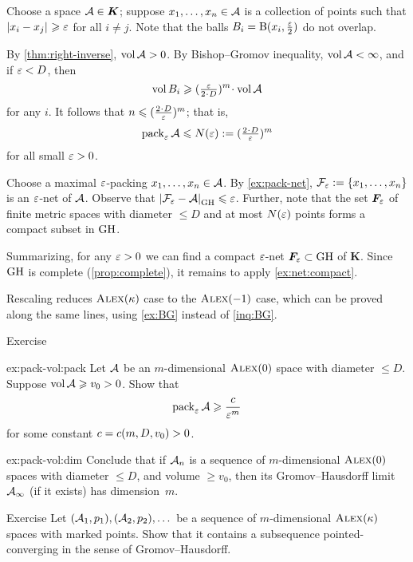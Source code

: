 Choose a space $\mathcal{A}\in \bm{K}$;
suppose $x_1,\dots,x_n\in \mathcal{A}$ is a collection of points such that $|{x_i}-{x_j}|_{}^{{}}\geqslant \varepsilon$ for all $i\ne j$.
Note that the balls $B_i=\mathrm{B}{}(x_i,\tfrac{\varepsilon}2)$ do not overlap.

By \ref{thm:right-inverse}, $\operatorname{\rm vol}\nolimits \mathcal{A}>0$.
By Bishop--Gromov inequality, $\operatorname{\rm vol}\nolimits \mathcal{A}<\infty$,
and if $\varepsilon<D$, then 
\[\vol B_i\ge (\tfrac\eps{2\cdot D})^m\cdot\vol \spc{A}\]
for any $i$.
It follows that $n\le (\tfrac{2\cdot D}\eps)^m$;
that is, 
\[\pack_\eps\spc{A}\le  N(\eps)\df(\tfrac{2\cdot D}\eps)^m\]
for all small $\varepsilon>0$.

Choose a maximal $\varepsilon$-packing $x_1,\dots,x_n\in \mathcal{A}$.
By \ref{ex:pack-net}, $\mathcal{F}_\varepsilon\mathrel{:=}\{x_1,\dots,x_n\}$ is an $\varepsilon$-net of $\mathcal{A}$.
Observe that $|{\mathcal{F}_\varepsilon}-{\mathcal{A}}|_{\operatorname{\rm GH}\nolimits}^{{}}\leqslant \varepsilon$.
Further, note that the set $\bm{F}_\varepsilon$ of finite metric spaces with diameter $\le D$ and at most $N(\varepsilon)$ points forms a compact subset in $\operatorname{\rm GH}\nolimits$.

Summarizing, for any $\varepsilon>0$ we can find a compact $\varepsilon$-net $\bm{F}_\varepsilon\subset \operatorname{\rm GH}\nolimits$ of $\bm{K}$.
Since $\operatorname{\rm GH}\nolimits$ is complete (\ref{prop:complete}), it remains to apply \ref{ex:net:compact}.

Rescaling reduces $\textsc{Alex}(\kappa)$ case to the $\textsc{Alex}(-1)$ case, which can be proved along the same lines, using \ref{ex:BG} instead of \ref{inq:BG}.
\qeds

\begin{thm}{Exercise}\label{ex:pack-vol}

\begin{subthm}{ex:pack-vol:pack}
Let $\mathcal{A}$ be an $m$-dimensional $\textsc{Alex}(0)$ space with diameter $\le D$.
Suppose $\operatorname{\rm vol}\nolimits\mathcal{A}\geqslant v_0>0$.
Show that 
\[\operatorname{\rm pack}\nolimits_\varepsilon\mathcal{A}\geqslant \frac{c}{\varepsilon^m}\]
for some constant $c=c(m,D,v_0)>0$.
\end{subthm}


\begin{subthm}{ex:pack-vol:dim}
Conclude that if $\mathcal{A}_n$ is a sequence of $m$-dimensional $\textsc{Alex}(0)$ spaces with diameter $\le D$, and volume $\ge v_0$, then its Gromov--Hausdorff limit $\mathcal{A}_\infty$ (if it exists) has dimension~$m$.
\end{subthm}
\end{thm}

\begin{thm}{Exercise}\label{ex:diam-compact:GH}
Let $(\mathcal{A}_1,p_1),(\mathcal{A}_2,p_2),\dots$ be a sequence of $m$-dimensional $\textsc{Alex}(\kappa)$ spaces with marked points.
Show that it contains a subsequence pointed-converging in the sense of Gromov--Hausdorff.

\end{thm}
